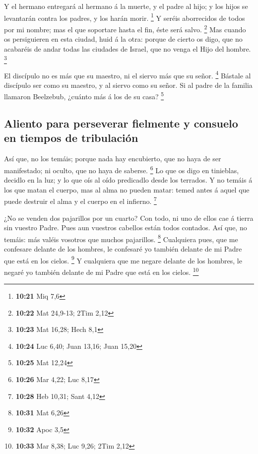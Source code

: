  Y el hermano entregará al hermano á la muerte, y el padre
al hijo; y los hijos se levantarán contra los padres, y los harán morir.
\footnote{\textbf{10:21} Miq 7,6}  Y seréis aborrecidos de
todos por mi nombre; mas el que soportare hasta el fin, éste será salvo.
\footnote{\textbf{10:22} Mat 24,9-13; 2Tim 2,12}  Mas
cuando os persiguieren en esta ciudad, huid á la otra: porque de cierto
os digo, que no acabaréis de andar todas las ciudades de Israel, que no
venga el Hijo del hombre. \footnote{\textbf{10:23} Mat 16,28; Hech 8,1}

 El discípulo no es más que su maestro, ni el siervo más
que su señor. \footnote{\textbf{10:24} Luc 6,40; Juan 13,16; Juan 15,20}
 Bástale al discípulo ser como su maestro, y al siervo como
su señor. Si al padre de la familia llamaron Beelzebub, ¿cuánto más á
los de su casa? \footnote{\textbf{10:25} Mat 12,24}

\hypertarget{aliento-para-perseverar-fielmente-y-consuelo-en-tiempos-de-tribulaciuxf3n}{%
\subsection{Aliento para perseverar fielmente y consuelo en tiempos de
tribulación}\label{aliento-para-perseverar-fielmente-y-consuelo-en-tiempos-de-tribulaciuxf3n}}

 Así que, no los temáis; porque nada hay encubierto, que no
haya de ser manifestado; ni oculto, que no haya de saberse. \footnote{\textbf{10:26}
  Mar 4,22; Luc 8,17}  Lo que os digo en tinieblas, decidlo
en la luz; y lo que oís al oído predicadlo desde los terrados.
 Y no temáis á los que matan el cuerpo, mas al alma no
pueden matar: temed antes á aquel que puede destruir el alma y el cuerpo
en el infierno. \footnote{\textbf{10:28} Heb 10,31; Sant 4,12}

 ¿No se venden dos pajarillos por un cuarto? Con todo, ni
uno de ellos cae á tierra sin vuestro Padre.  Pues aun
vuestros cabellos están todos contados.  Así que, no
temáis: más valéis vosotros que muchos pajarillos. \footnote{\textbf{10:31}
  Mat 6,26}  Cualquiera pues, que me confesare delante de
los hombres, le confesaré yo también delante de mi Padre que está en los
cielos. \footnote{\textbf{10:32} Apoc 3,5}  Y cualquiera
que me negare delante de los hombres, le negaré yo también delante de mi
Padre que está en los cielos. \footnote{\textbf{10:33} Mar 8,38; Luc
  9,26; 2Tim 2,12}

